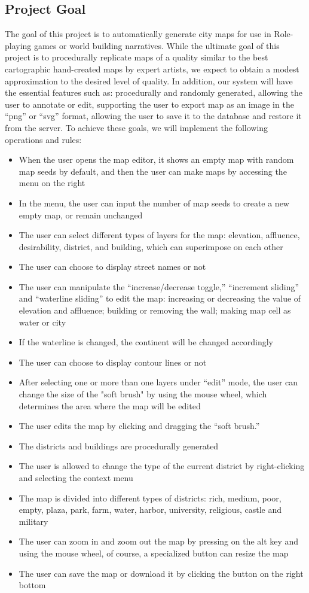 \subsection{Project Goal}
The goal of this project is to automatically generate city maps for use in Role-playing games or world building narratives. While the ultimate goal of this project is to procedurally replicate maps of a quality similar to the best cartographic hand-created maps by expert artists, we expect to obtain a modest approximation to the desired level of quality. In addition, our system will have the essential features such as: procedurally and randomly generated, allowing the user to annotate or edit, supporting the user to export map as an image in the ``png'' or ``svg'' format, allowing the user to save it to the database and restore it from the server. To achieve these goals, we will implement the following operations and rules:
\begin{itemize}
	\item When the user opens the map editor, it shows an empty map with random map seeds by default, and then the user can make maps by accessing the menu on the right
	\item In the menu, the user can input the number of map seeds to create a new empty map, or remain unchanged
	\item The user can select different types of layers for the map: elevation, affluence, desirability, district, and building, which can superimpose on each other
  \item The user can choose to display street names or not
  \item The user can manipulate the ``increase/decrease toggle,'' ``increment sliding'' and ``waterline sliding'' to edit the map: increasing or decreasing the value of elevation and affluence; building or removing the wall; making map cell as water or city
  \item If the waterline is changed, the continent will be changed accordingly
  \item The user can choose to display contour lines or not
  \item After selecting one or more than one layers under ``edit'' mode, the user can change the size of the "soft brush" by using the mouse wheel, which determines the area where the map will be edited
  \item The user edits the map by clicking and dragging the ``soft brush.''
  \item The districts and buildings are procedurally generated
  \item The user is allowed to change the type of the current district by right-clicking and selecting the context menu
  \item The map is divided into different types of districts: rich, medium, poor, empty, plaza, park, farm, water, harbor, university, religious, castle and military
  \item The user can zoom in and zoom out the map by pressing on the alt key and using the mouse wheel, of course, a specialized button can resize the map
  \item The user can save the map or download it by clicking the button on the right bottom
\end{itemize}

